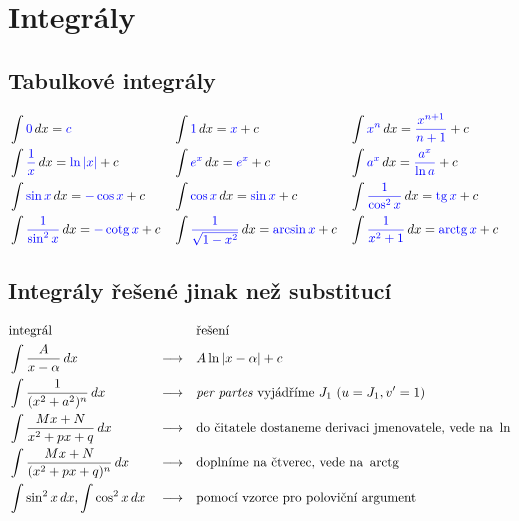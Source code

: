 \section{Integrály}\label{appint}
\subsection*{Tabulkové integrály}
\begin{align*}
&\int \textcolor{blue}{0} \, dx = \textcolor{blue}{c} & & \int \textcolor{blue}{1}\,  dx = \textcolor{blue}{x}+c & & \int \textcolor{blue}{x^n} \, dx = \textcolor{blue}{\frac{x^{n+1}}{n+1}}+c \\
&\int \textcolor{blue}{\frac{1}{x}} \, dx = \textcolor{blue}{\operatorname{ln} |x|} + c & & \int \textcolor{blue}{e^x}\, dx = \textcolor{blue}{e^x}+c & &  \int \textcolor{blue}{a^x} \, dx = \textcolor{blue}{\frac{a^x}{\operatorname{ln} a}} + c \\
&\int \textcolor{blue}{\sin x} \, dx = \textcolor{blue}{-\cos x} + c & & \int \textcolor{blue}{\cos x} \, dx = \textcolor{blue}{\sin x} +c & &\int \textcolor{blue}{\frac{1}{\cos^2 x}}\, dx = \textcolor{blue}{\operatorname{tg} x} + c \\
&\int \textcolor{blue}{\frac{1}{\sin^2 x}} \, dx = \textcolor{blue}{-\operatorname{cotg} x}+c & & \int \textcolor{blue}{\frac{1}{\sqrt{1-x^2} }}\, dx = \textcolor{blue}{\arcsin x} + c & &\int \textcolor{blue}{\frac{1}{x^2+1}}\, dx = \textcolor{blue}{\operatorname{arctg} x} + c&
\end{align*}

\subsection*{Integrály řešené jinak než substitucí}
\begin{align*}
    &\textrm{integrál}                        & &                 & & \textrm{řešení} \\
    &\int \frac{A}{x-\alpha}\, dx             & & \longrightarrow & & A\operatorname{ln}|x-\alpha|+c \\
    &\int \frac{1}{(x^2+a^2)^n}\, dx          & & \longrightarrow & & \textit{per partes } \textrm{vyjádříme } J_1 \textrm{ ($u=J_1, v^\prime=1$)}\\
    &\int \frac{Mx+N}{x^2+px+q}\, dx          & & \longrightarrow & & \textrm{do čitatele dostaneme derivaci jmenovatele, vede na } \operatorname{ln} \\
    &\int \frac{Mx+N}{(x^2+px+q)^n}\, dx      & & \longrightarrow & & \textrm{doplníme na čtverec, vede na } \operatorname{arctg}  \\
    &\int \sin^2 x\, dx, \int \cos^2 x \, dx  & & \longrightarrow & & \textrm{pomocí vzorce pro poloviční argument}
\end{align*}

